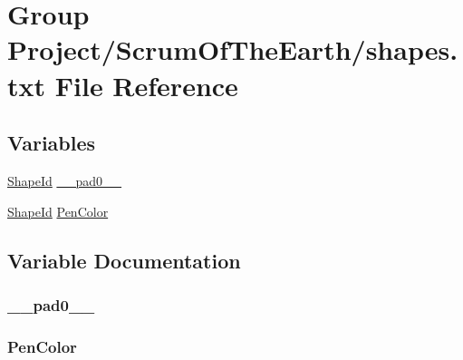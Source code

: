 \hypertarget{shapes_8txt}{}\section{Group Project/\+Scrum\+Of\+The\+Earth/shapes.txt File Reference}
\label{shapes_8txt}
\subsection*{Variables}
\begin{DoxyCompactItemize}
\item 
\hyperlink{shape__input__file__specs_8txt_a467b0c8874f7e5c808ddbfae7144d412}{Shape\+Id} \hyperlink{shapes_8txt_acb227b3ee2e839ee3237ece2e8082307}{\+\_\+\+\_\+pad0\+\_\+\+\_\+}
\item 
\hyperlink{shape__input__file__specs_8txt_a467b0c8874f7e5c808ddbfae7144d412}{Shape\+Id} \hyperlink{shapes_8txt_a0fa4282f357d62c83340e0b9b2c142b6}{Pen\+Color}
\end{DoxyCompactItemize}


\subsection{Variable Documentation}
\subsubsection[{\texorpdfstring{\+\_\+\+\_\+pad0\+\_\+\+\_\+}{__pad0__}}]{ \+\_\+\+\_\+pad0\+\_\+\+\_\+}\hypertarget{shapes_8txt_acb227b3ee2e839ee3237ece2e8082307}{}\label{shapes_8txt_acb227b3ee2e839ee3237ece2e8082307}
\subsubsection[{\texorpdfstring{Pen\+Color}{PenColor}}]{ Pen\+Color}\hypertarget{shapes_8txt_a0fa4282f357d62c83340e0b9b2c142b6}{}\label{shapes_8txt_a0fa4282f357d62c83340e0b9b2c142b6}
